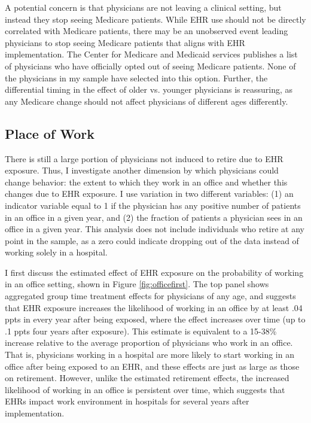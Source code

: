 \documentclass[12pt]{article}
\begin{document}
A potential concern is that physicians are not leaving a clinical setting, but instead they stop seeing Medicare patients. While EHR use should not be directly correlated with Medicare patients, there may be an unobserved event leading physicians to stop seeing Medicare patients that aligns with EHR implementation. The Center for Medicare and Medicaid services publishes a list of physicians who have officially opted out of seeing Medicare patients. None of the physicians in my sample have selected into this option. Further, the differential timing in the effect of older vs. younger physicians is reassuring, as any Medicare change should not affect physicians of different ages differently.  



\subsection{Place of Work}

There is still a large portion of physicians not induced to retire due to EHR exposure. Thus, I investigate another dimension by which physicians could change behavior: the extent to which they work in an office and whether this changes due to EHR exposure. I use variation in two different variables: (1) an indicator variable equal to 1 if the physician has any positive number of patients in an office in a given year, and (2) the fraction of patients a physician sees in an office in a given year. This analysis does not include individuals who retire at any point in the sample, as a zero could indicate dropping out of the data instead of working solely in a hospital. 

I first discuss the estimated effect of EHR exposure on the probability of working in an office setting, shown in Figure \ref{fig:officefirst}. The top panel shows aggregated group time treatment effects for physicians of any age, and suggests that EHR exposure increases the likelihood of working in an office by at least .04 ppts in every year after being exposed, where the effect increases over time (up to .1 ppts four years after exposure). This estimate is equivalent to a 15-38\% increase relative to the average proportion of physicians who work in an office. That is, physicians working in a hospital are more likely to start working in an office after being exposed to an EHR, and these effects are just as large as those on retirement. However, unlike the estimated retirement effects, the increased likelihood of working in an office is persistent over time, which suggests that EHRs impact work environment in hospitals for several years after implementation.
\end{document}
